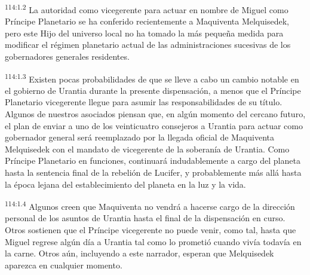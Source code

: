 \documentclass[twoside, 11pt]{book}
\begin{document}
\par
\textsuperscript{114:1.2} La autoridad como vicegerente para actuar en nombre de Miguel como Príncipe Planetario se ha conferido recientemente a Maquiventa Melquisedek, pero este Hijo del universo local no ha tomado la más pequeña medida para modificar el régimen planetario actual de las administraciones sucesivas de los gobernadores generales residentes.

\par
\textsuperscript{114:1.3} Existen pocas probabilidades de que se lleve a cabo un cambio notable en el gobierno de Urantia durante la presente dispensación, a menos que el Príncipe Planetario vicegerente llegue para asumir las responsabilidades de su título. Algunos de nuestros asociados piensan que, en algún momento del cercano futuro, el plan de enviar a uno de los veinticuatro consejeros a Urantia para actuar como gobernador general será reemplazado por la llegada oficial de Maquiventa Melquisedek con el mandato de vicegerente de la soberanía de Urantia. Como Príncipe Planetario en funciones, continuará indudablemente a cargo del planeta hasta la sentencia final de la rebelión de Lucifer, y probablemente más allá hasta la época lejana del establecimiento del planeta en la luz y la vida.

\par
\textsuperscript{114:1.4} Algunos creen que Maquiventa no vendrá a hacerse cargo de la dirección personal de los asuntos de Urantia hasta el final de la dispensación en curso. Otros sostienen que el Príncipe vicegerente no puede venir, como tal, hasta que Miguel regrese algún día a Urantia tal como lo prometió cuando vivía todavía en la carne. Otros aún, incluyendo a este narrador, esperan que Melquisedek aparezca en cualquier momento.
\end{document}
